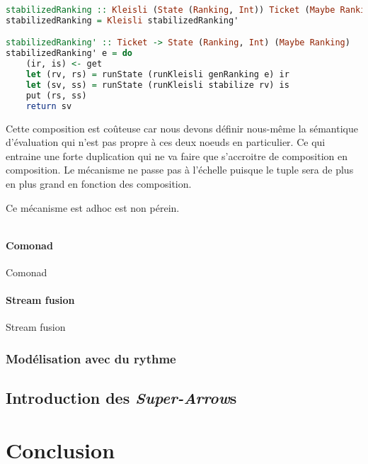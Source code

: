\documentclass{llncs}
\newcommand{\SAs}{\emph{Super-Arrow}s }
\begin{document}
\begin{lstlisting}[language=haskell]
stabilizedRanking :: Kleisli (State (Ranking, Int)) Ticket (Maybe Ranking)
stabilizedRanking = Kleisli stabilizedRanking'

stabilizedRanking' :: Ticket -> State (Ranking, Int) (Maybe Ranking)
stabilizedRanking' e = do
    (ir, is) <- get
    let (rv, rs) = runState (runKleisli genRanking e) ir
    let (sv, ss) = runState (runKleisli stabilize rv) is
    put (rs, ss)
    return sv
\end{lstlisting}

Cette composition est coûteuse car nous devons définir nous-même la sémantique
d'évaluation qui n'est pas propre à ces deux noeuds en particulier.
Ce qui entraine une forte duplication qui ne va faire que s'accroitre de
composition en composition.
Le mécanisme ne passe pas à l'échelle puisque le tuple sera de plus en plus
grand en fonction des composition.

Ce mécanisme est adhoc est non pérein.

\begin{lstlisting}[language=haskell]
\end{lstlisting}

\paragraph{Comonad}
Comonad~\cite{Brookes91}~\cite{Coutts07}
\paragraph{Stream fusion}
Stream fusion~\cite{Yi05}

\subsubsection{Modélisation avec du rythme}

\subsection{Introduction des \SAs}

\section{Conclusion}

% 

% 



\end{document}

